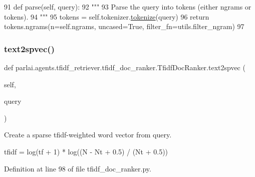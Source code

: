 \begin{DoxyCode}
91     \textcolor{keyword}{def }parse(self, query):
92         \textcolor{stringliteral}{"""}
93 \textcolor{stringliteral}{        Parse the query into tokens (either ngrams or tokens).}
94 \textcolor{stringliteral}{        """}
95         tokens = self.tokenizer.\hyperlink{namespaceparlai_1_1agents_1_1tfidf__retriever_1_1build__tfidf_a1fdb457e98eb4e4c26047e229686a616}{tokenize}(query)
96         \textcolor{keywordflow}{return} tokens.ngrams(n=self.ngrams, uncased=\textcolor{keyword}{True}, filter\_fn=utils.filter\_ngram)
97 
\end{DoxyCode}
\mbox{\label{classparlai_1_1agents_1_1tfidf__retriever_1_1tfidf__doc__ranker_1_1TfidfDocRanker_ac6d8b86317616a64f5bc7f8f607dd997}} 
\subsubsection{\texorpdfstring{text2spvec()}{text2spvec()}}
{\footnotesize\ttfamily def parlai.\+agents.\+tfidf\+\_\+retriever.\+tfidf\+\_\+doc\+\_\+ranker.\+Tfidf\+Doc\+Ranker.\+text2spvec (\begin{DoxyParamCaption}\item[{}]{self,  }\item[{}]{query }\end{DoxyParamCaption})}

\begin{DoxyVerb}Create a sparse tfidf-weighted word vector from query.

tfidf = log(tf + 1) * log((N - Nt + 0.5) / (Nt + 0.5))
\end{DoxyVerb}
 

Definition at line 98 of file tfidf\+\_\+doc\+\_\+ranker.\+py.


